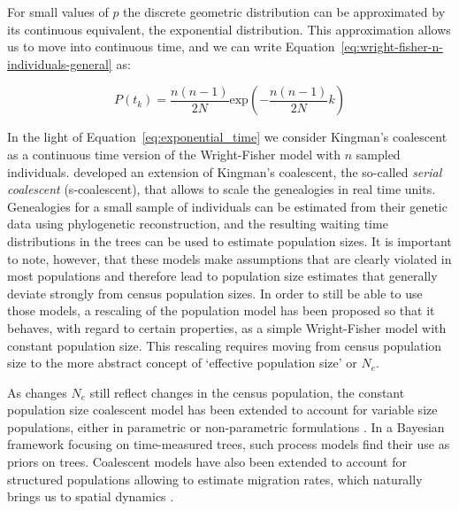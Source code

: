 For small values of $p$ the discrete geometric distribution can be approximated by its continuous equivalent, the exponential distribution. 
%
%
This approximation allows us to move into continuous time, and we can write Equation~\ref{eq:wright-fisher-n-individuals-general} as:

\begin{equation}
P\left(t_{k}\right)=\frac{n\left(n-1\right)}{2N}\textrm{exp}\left(-\frac{n\left(n-1\right)}{2N}k\right)
\label{eq:exponential_time}
\end{equation}

In the light of Equation~\ref{eq:exponential_time} we consider Kingman's coalescent as a continuous time version of the Wright-Fisher model with $n$ sampled individuals.
\cite{Rodrigo1999} developed an extension of Kingman's coalescent, the so-called \textit{serial coalescent} (s-coalescent), that allows to scale the genealogies in real time units.
Genealogies for a small sample of individuals can be estimated from their genetic data using phylogenetic reconstruction, and the resulting waiting time distributions in the trees can be used to estimate population sizes.
It is important to note, however, that these models make assumptions that are clearly violated in most populations and therefore lead to population size estimates that generally  deviate strongly from census population sizes. 
In order to still be able to use those models, a rescaling of the population model has been proposed so that it behaves, with regard to certain properties, as a simple Wright-Fisher model with constant population size.
This rescaling requires moving from census population size to the more abstract concept of `effective population size' or $N_{e}$.

As changes $N_{e}$ still reflect changes in the census population, the constant population size coalescent model has been extended to account for variable size populations, either in parametric \citep{Pybus2002} or non-parametric formulations \citep{Minin2008, Gill2013}. 
In a Bayesian framework focusing on time-measured trees, such process models find their use as priors on trees.
Coalescent models have also been extended to account for structured populations allowing to estimate migration rates, which naturally brings us to spatial dynamics \citep{Kuhner2006,migrate}.

